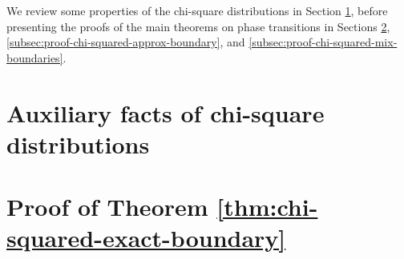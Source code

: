 
We review some properties of the chi-square distributions in Section \ref{sec:chi-square-distributions}, before presenting the proofs of the main theorems on phase transitions in Sections \ref{subsec:proof-chi-squared-exact-boundary}, \ref{subsec:proof-chi-squared-approx-boundary}, and \ref{subsec:proof-chi-squared-mix-boundaries}.


\section{Auxiliary facts of chi-square distributions}
\label{sec:chi-square-distributions}



\section{Proof of Theorem \ref{thm:chi-squared-exact-boundary}}
\label{subsec:proof-chi-squared-exact-boundary}

